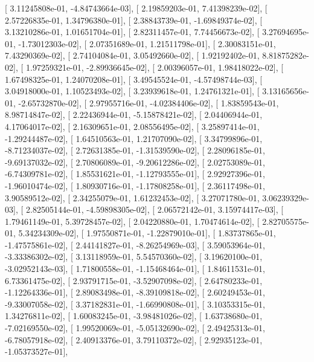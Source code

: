 \documentclass{article}
\begin{document}
       [ 3.11245808e-01, -4.84743664e-03],
       [ 2.19859203e-01,  7.41398239e-02],
       [ 2.57226835e-01,  1.34796380e-01],
       [ 2.38843739e-01, -1.69849374e-02],
       [ 3.13210286e-01,  1.01651704e-01],
       [ 2.82311457e-01,  7.74456673e-02],
       [ 3.27694695e-01, -1.73012303e-02],
       [ 2.07351689e-01,  1.21511798e-01],
       [ 2.30083151e-01,  7.43290369e-02],
       [ 2.74104084e-01,  3.05492660e-02],
       [ 1.92192402e-01,  8.81875282e-02],
       [ 1.97259321e-01, -2.89936645e-02],
       [ 2.00396057e-01,  1.98418022e-02],
       [ 1.67498325e-01,  1.24070208e-01],
       [ 3.49545524e-01, -4.57498744e-03],
       [ 3.04918000e-01,  1.10523493e-02],
       [ 3.23939618e-01,  1.24761321e-01],
       [ 3.13165656e-01, -2.65732870e-02],
       [ 2.97955716e-01, -4.02384406e-02],
       [ 1.83859543e-01,  8.98714847e-02],
       [ 2.22436944e-01, -5.15878421e-02],
       [ 2.04406944e-01,  4.17064017e-02],
       [ 2.16309651e-01,  2.08556495e-02],
       [ 3.25897414e-01, -1.29244487e-02],
       [ 1.64510563e-01,  1.21707090e-02],
       [ 3.34799896e-01, -8.71234037e-02],
       [ 2.72631385e-01, -1.31539590e-02],
       [ 2.28096185e-01, -9.69137032e-02],
       [ 2.70806089e-01, -9.20612286e-02],
       [ 2.02753089e-01, -6.74309781e-02],
       [ 1.85531621e-01, -1.12793555e-01],
       [ 2.92927396e-01, -1.96010474e-02],
       [ 1.80930716e-01, -1.17808258e-01],
       [ 2.36117498e-01,  3.90589512e-02],
       [ 2.34255079e-01,  1.61232453e-02],
       [ 3.27071780e-01,  3.06239329e-03],
       [ 2.82505144e-01, -4.59898305e-02],
       [ 2.06572142e-01,  3.15974417e-03],
       [ 1.79461149e-01,  5.39728457e-02],
       [ 2.04220880e-01,  1.70474614e-02],
       [ 2.82705575e-01,  5.34234309e-02],
       [ 1.97550871e-01, -1.22879010e-01],
       [ 1.83737865e-01, -1.47575861e-02],
       [ 2.44141827e-01, -8.26254969e-03],
       [ 3.59053964e-01, -3.33386302e-02],
       [ 3.13118959e-01,  5.54570360e-02],
       [ 3.19620100e-01, -3.02952143e-03],
       [ 1.71800558e-01, -1.15468464e-01],
       [ 1.84611531e-01,  6.73361475e-02],
       [ 2.93791715e-01, -3.52907098e-02],
       [ 2.64780233e-01, -1.12264336e-01],
       [ 2.89083498e-01, -8.39109818e-02],
       [ 2.60249453e-01, -9.33007058e-02],
       [ 3.37182831e-01, -1.66990808e-01],
       [ 3.10353315e-01,  1.34276811e-02],
       [ 1.60083245e-01, -3.98481026e-02],
       [ 1.63738680e-01, -7.02169550e-02],
       [ 1.99520069e-01, -5.05132690e-02],
       [ 2.49425313e-01, -6.78057918e-02],
       [ 2.40913376e-01,  3.79110372e-02],
       [ 2.92935123e-01, -1.05373527e-01],
\end{document}
